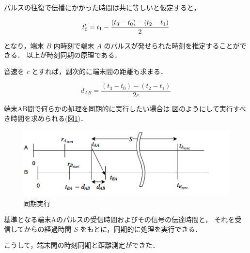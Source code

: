 パルスの往復で伝播にかかった時間は共に等しいと仮定すると，

$$
t_0' = t_1 - \frac{(t_3 - t_0) - (t_2 - t_1)}{2} \\
$$

となり，端末 $B$ 内時刻で端末 $A$ のパルスが発せられた時刻を推定することができる．
以上が時刻同期の原理である．

音速を $c$ とすれば，副次的に端末間の距離も求まる．

$$
d_{AB} = \frac{(t_3 - t_0) - (t_2 - t_1)}{2c}
$$

端末AB間で何らかの処理を同期的に実行したい場合は
図のようにして実行すべき時間を求められる(図\ref{fig:flowchart3})．

\begin{figure}[tb]\centering
  \hspace{-2mm}\includegraphics[clip,width=1.1\hsize]{img/flowchart3.png}
  \caption{同期実行}\label{fig:flowchart3}
\end{figure}

基準となる端末Aのパルスの受信時間およびその信号の伝達時間と，
それを受信してからの経過時間 $S$ をもとに，同期的に処理を実行できる．

こうして，端末間の時刻同期と距離測定ができた．
